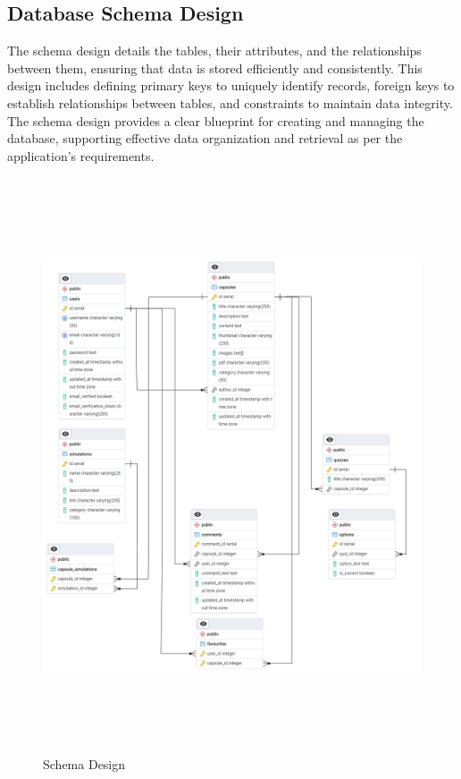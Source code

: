 \subsection{Database Schema Design}
The schema design details the tables, their attributes, and the relationships between them, ensuring that data is stored efficiently and consistently. This design includes defining primary keys to uniquely identify records, foreign keys to establish relationships between tables, and constraints to maintain data integrity. The schema design provides a clear blueprint for creating and managing the database, supporting effective data organization and retrieval as per the application’s requirements.
\begin{figure}[H]
   \centering
    \includegraphics[height = 17cm]{Diagrams/Schema Design.png}
    \caption{Schema Design}
\end{figure}
\newpage


